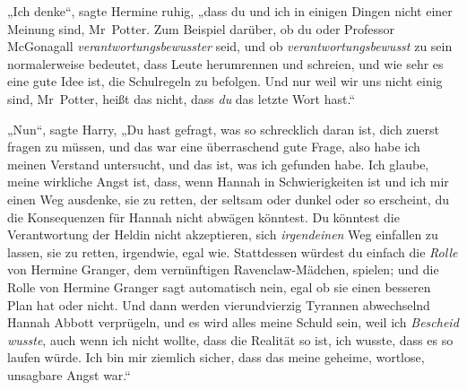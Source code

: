 „Ich denke“, sagte Hermine ruhig, „dass du und ich in einigen Dingen nicht einer Meinung sind, Mr~Potter. Zum Beispiel darüber, ob du oder Professor McGonagall \emph{verantwortungsbewusster} seid, und ob \emph{verantwortungsbewusst} zu sein normalerweise bedeutet, dass Leute herumrennen und schreien, und wie sehr es eine gute Idee ist, die Schulregeln zu befolgen. Und nur weil wir uns nicht einig sind, Mr~Potter, heißt das nicht, dass \emph{du} das letzte Wort hast.“

„Nun“, sagte Harry, „Du hast gefragt, was so schrecklich daran ist, dich zuerst fragen zu müssen, und das war eine überraschend gute Frage, also habe ich meinen Verstand untersucht, und das ist, was ich gefunden habe. Ich glaube, meine wirkliche Angst ist, dass, wenn Hannah in Schwierigkeiten ist und ich mir einen Weg ausdenke, sie zu retten, der seltsam oder dunkel oder so erscheint, du die Konsequenzen für Hannah nicht abwägen könntest. Du könntest die Verantwortung der Heldin nicht akzeptieren, sich \emph{irgendeinen} Weg einfallen zu lassen, sie zu retten, irgendwie, egal wie. Stattdessen würdest du einfach die \emph{Rolle} von Hermine Granger, dem vernünftigen Ravenclaw-Mädchen, spielen; und die Rolle von Hermine Granger sagt automatisch nein, egal ob sie einen besseren Plan hat oder nicht. Und dann werden vierundvierzig Tyrannen abwechselnd Hannah Abbott verprügeln, und es wird alles meine Schuld sein, weil ich \emph{Bescheid wusste}, auch wenn ich nicht wollte, dass die Realität so ist, ich wusste, dass es so laufen würde. Ich bin mir ziemlich sicher, dass das meine geheime, wortlose, unsagbare Angst war.“


